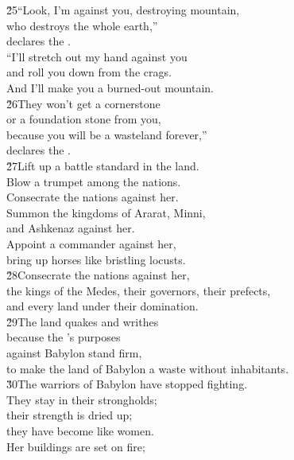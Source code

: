 \begin{poetry}
\poeml \v{25}``Look, I'm against you, destroying mountain, \\
\poemll    who destroys the whole earth,'' \\
\poemlll       declares the . \\
\poeml ``I'll stretch out my hand against you \\
\poemll    and roll you down from the crags. \\
\poemlll       And I'll make you a burned-out mountain. \\
\poeml \v{26}They won't get a cornerstone \\
\poemll    or a foundation stone from you, \\
\poeml because you will be a wasteland forever,'' \\
\poemll    declares the . \\
\poeml \v{27}Lift up a battle standard in the land. \\
\poemll    Blow a trumpet among the nations. \\
\poeml Consecrate the nations against her. \\
\poemll    Summon the kingdoms of Ararat, Minni, \\
\poemlll       and Ashkenaz against her. \\
\poeml Appoint a commander against her, \\
\poemll    bring up horses like bristling locusts. \\
\poeml \v{28}Consecrate the nations against her, \\
\poemll    the kings of the Medes, their governors, their prefects, \\
\poemlll       and every land under their domination. \\
\poeml \v{29}The land quakes and writhes \\
\poemll    because the 's purposes \\
\poeml against Babylon stand firm, \\
\poemll    to make the land of Babylon a waste without inhabitants. \\
\poeml \v{30}The warriors of Babylon have stopped fighting. \\
\poemll    They stay in their strongholds; \\
\poeml their strength is dried up; \\
\poemll    they have become like women. \\
\poeml Her buildings are set on fire; \\

\end{poetry}
